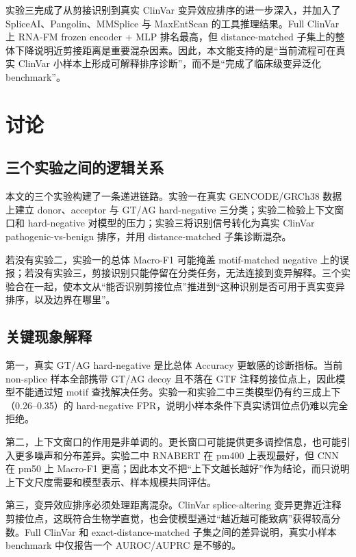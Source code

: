 \documentclass[
    oneside,
    fontset = win,
  ]{njuthesis}
\begin{document}
实验三完成了从剪接识别到真实 ClinVar 变异效应排序的进一步深入，并加入了 SpliceAI、Pangolin、MMSplice 与 MaxEntScan 的工具推理结果。Full ClinVar 上 RNA-FM frozen encoder + MLP 排名最高，但 distance-matched 子集上的整体下降说明近剪接距离是重要混杂因素。因此，本文能支持的是“当前流程可在真实 ClinVar 小样本上形成可解释排序诊断”，而不是“完成了临床级变异泛化 benchmark”。

\chapter{讨论}

\section{三个实验之间的逻辑关系}

本文的三个实验构建了一条递进链路。实验一在真实 GENCODE/GRCh38 数据上建立 donor、acceptor 与 GT/AG hard-negative 三分类；实验二检验上下文窗口和 hard-negative 对模型的压力；实验三将识别信号转化为真实 ClinVar pathogenic-vs-benign 排序，并用 distance-matched 子集诊断混杂。

若没有实验二，实验一的总体 Macro-F1 可能掩盖 motif-matched negative 上的误报；若没有实验三，剪接识别只能停留在分类任务，无法连接到变异解释。三个实验合在一起，使本文从“能否识别剪接位点”推进到“这种识别是否可用于真实变异排序，以及边界在哪里”。

\section{关键现象解释}

第一，真实 GT/AG hard-negative 是比总体 Accuracy 更敏感的诊断指标。当前 non-splice 样本全部携带 GT/AG decoy 且不落在 GTF 注释剪接位点上，因此模型不能通过短 motif 查找解决任务。实验一和实验二中三类模型仍有约三成上下（0.26--0.35）的 hard-negative FPR，说明小样本条件下真实诱饵位点仍难以完全拒绝。

第二，上下文窗口的作用是非单调的。更长窗口可能提供更多调控信息，也可能引入更多噪声和分布差异。实验二中 RNABERT 在 pm400 上表现最好，但 CNN 在 pm50 上 Macro-F1 更高；因此本文不把“上下文越长越好”作为结论，而只说明上下文尺度需要和模型表示、样本规模共同评估。

第三，变异效应排序必须处理距离混杂。ClinVar splice-altering 变异更靠近注释剪接位点，这既符合生物学直觉，也会使模型通过“越近越可能致病”获得较高分数。Full ClinVar 和 exact-distance-matched 子集之间的差异说明，真实小样本 benchmark 中仅报告一个 AUROC/AUPRC 是不够的。
\end{document}
